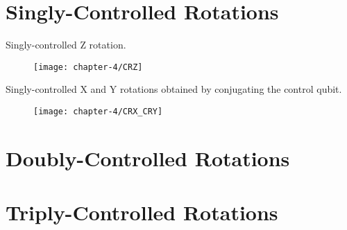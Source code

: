 \section{Singly-Controlled Rotations}
Singly-controlled Z rotation.

\begin{figure}[hb]
    \centering
    \texttt{[image: chapter-4/CRZ]}
\end{figure}

Singly-controlled X and Y rotations obtained by conjugating the control qubit.

\begin{figure}[hb]
    \centering
    \texttt{[image: chapter-4/CRX\_CRY]}
\end{figure}

\section{Doubly-Controlled Rotations}

\section{Triply-Controlled Rotations}

